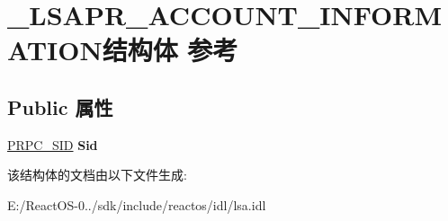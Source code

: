 \hypertarget{struct___l_s_a_p_r___a_c_c_o_u_n_t___i_n_f_o_r_m_a_t_i_o_n}{}\section{\+\_\+\+L\+S\+A\+P\+R\+\_\+\+A\+C\+C\+O\+U\+N\+T\+\_\+\+I\+N\+F\+O\+R\+M\+A\+T\+I\+O\+N结构体 参考}
\label{struct___l_s_a_p_r___a_c_c_o_u_n_t___i_n_f_o_r_m_a_t_i_o_n}
\subsection*{Public 属性}
\begin{DoxyCompactItemize}
\item 
\mbox{\label{struct___l_s_a_p_r___a_c_c_o_u_n_t___i_n_f_o_r_m_a_t_i_o_n_aa8d4038a2366150af3e591640a257e98}} 
\hyperlink{struct___r_p_c___s_i_d}{P\+R\+P\+C\+\_\+\+S\+ID} {\bfseries Sid}
\end{DoxyCompactItemize}


该结构体的文档由以下文件生成\+:\begin{DoxyCompactItemize}
\item 
E\+:/\+React\+O\+S-\/0../sdk/include/reactos/idl/lsa.\+idl\end{DoxyCompactItemize}
